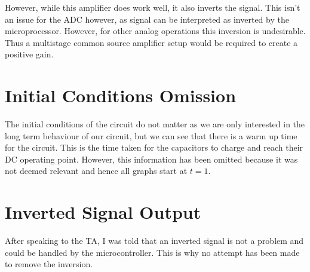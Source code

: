 \documentclass[journal]{IEEEtran}
\begin{document}
However, while this amplifier does work well, it also inverts the signal. This isn't an issue for the ADC however, as signal can be interpreted as inverted by the microprocessor. However, for other analog operations this inversion is undesirable. Thus a multistage common source amplifier setup would be required to create a positive gain.



%

\listoffigures

\appendices
\section{Initial Conditions Omission}
The initial conditions of the circuit do not matter as we are only interested in the long term behaviour of our circuit, but we can see that there is a warm up time for the circuit. This is the time taken for the capacitors to charge and reach their DC operating point. However, this information has been omitted because it was not deemed relevant and hence all graphs start at $t=1$.

\section{Inverted Signal Output}
After speaking to the TA, I was told that an inverted signal is not a problem and could be handled by the microcontroller. This is why no attempt has been made to remove the inversion.
\end{document}
